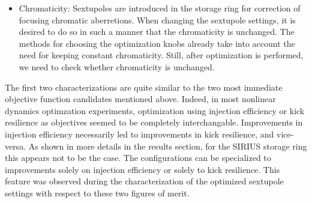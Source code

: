 \begin{itemize}
    \item Chromaticity: Sextupoles are introduced in the storage ring for correction of focusing chromatic aberretions. When changing the sextupole settings, it is desired to do so in such a manner that the chromaticity is unchanged. The methods for choosing the optimization knobs already take into account the need for keeping constant chromaticity. Still, after optimization is performed, we need to check whether chromaticity is unchanged.
\end{itemize}
The first two characterizations are quite similar to the two most immediate objective function candidates mentioned above. Indeed, in most nonlinear dynamics optimzation experiments, optimization using injection efficiency or kick resilience as objectives seemed to be completely interchangable. Improvements in injection efficiency necessarily led to improvements in kick resilience, and vice-versa. As shown in more details in the results section, for the SIRIUS storage ring this appears not to be the case. The configurations can be specialized to improvements solely on injection efficiency or solely to kick resilience. This feature was observed during the characterization of the optimized sextupole settings with respect to these two figures of merit.
